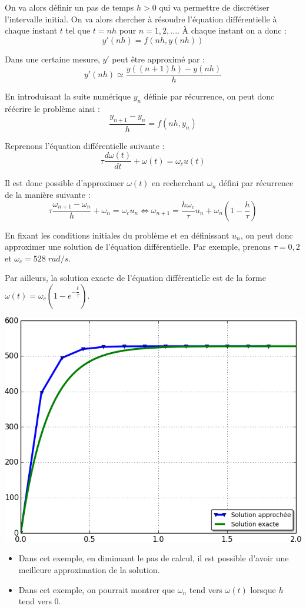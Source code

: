 \documentclass[10pt]{article}
\begin{document}
On va alors définir un pas de temps $h>0$ qui va permettre de discrétiser l'intervalle initial. On va alors chercher à résoudre l'équation différentielle à chaque instant $t$ tel que $t=nh$ pour $n=1,2,...$. \`A chaque instant on a donc : 
$$
y'(nh)=f(nh,y(nh))
$$ 

Dans une certaine mesure, $y'$ peut être approximé par :
$$
y'(nh)\simeq \dfrac{y((n+1)h)-y(nh)}{h}
$$

En introduisant la suite numérique $y_n$ définie par récurrence, on peut donc réécrire le problème ainsi :
$$
\dfrac{y_{n+1}-y_n}{h} = f(nh,y_n)
$$

\begin{exemple}
Reprenons l'équation différentielle suivante :
$$
\tau \dfrac{d\omega(t)}{dt} + \omega(t)= \omega_c u(t)
$$

Il est donc possible d'approximer $\omega(t)$ en recherchant $\omega_n$ défini par récurrence de la manière suivante :
$$
\tau \dfrac{\omega_{n+1}-\omega_n}{h} + \omega_n=  \omega_c u_n \Longleftrightarrow 
\omega_{n+1} =  \dfrac{h \omega_c}{\tau} u_n +  \omega_n\left(1-\dfrac{h}{\tau}\right)
$$

En fixant les conditions initiales du problème et en définissant $u_n$, on peut donc approximer une solution de l'équation différentielle. 
Par exemple, prenons $\tau=0,2$ et $\omega_c=528 \; rad/s$.

Par ailleurs, la solution exacte de l'équation différentielle est de la forme $\omega(t)=\omega_c\left( 1-e^{-\dfrac{t}{\tau}}\right)$.

\end{exemple}

\begin{center}
\includegraphics[width=.6\textwidth]{images/figure_1}
\end{center}

\begin{rem}
\begin{itemize}
\item Dans cet exemple, en diminuant le pas de calcul, il est possible d'avoir une meilleure approximation de la solution. 
\item Dans cet exemple, on pourrait montrer que $\omega_n$ tend vers $\omega(t)$ lorsque $h$ tend vers 0.
\end{itemize}
\end{rem}
\end{document}
